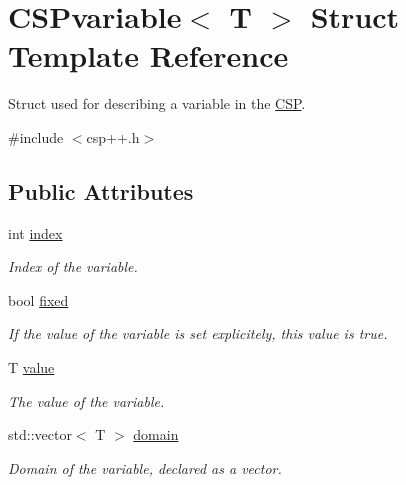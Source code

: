 \hypertarget{structCSPvariable}{
\section{CSPvariable$<$ T $>$ Struct Template Reference}
\label{structCSPvariable}
}


Struct used for describing a variable in the \hyperlink{classCSP}{CSP}.  




{\ttfamily \#include $<$csp++.h$>$}

\subsection*{Public Attributes}
\begin{DoxyCompactItemize}
\item 
\hypertarget{structCSPvariable_a1fb7622b0576133aa9a2445da22fddac}{
int \hyperlink{structCSPvariable_a1fb7622b0576133aa9a2445da22fddac}{index}}
\label{structCSPvariable_a1fb7622b0576133aa9a2445da22fddac}

\begin{DoxyCompactList}\small\item\em Index of the variable. \item\end{DoxyCompactList}\item 
\hypertarget{structCSPvariable_a8e7a1cbd9af27e295508794f871dc599}{
bool \hyperlink{structCSPvariable_a8e7a1cbd9af27e295508794f871dc599}{fixed}}
\label{structCSPvariable_a8e7a1cbd9af27e295508794f871dc599}

\begin{DoxyCompactList}\small\item\em If the value of the variable is set explicitely, this value is true. \item\end{DoxyCompactList}\item 
\hypertarget{structCSPvariable_acc2ff31b449351f04b1c3a2a096e584c}{
T \hyperlink{structCSPvariable_acc2ff31b449351f04b1c3a2a096e584c}{value}}
\label{structCSPvariable_acc2ff31b449351f04b1c3a2a096e584c}

\begin{DoxyCompactList}\small\item\em The value of the variable. \item\end{DoxyCompactList}\item 
\hypertarget{structCSPvariable_a66cf86ebf0fbbf8e571d7b585c9528a2}{
std::vector$<$ T $>$ \hyperlink{structCSPvariable_a66cf86ebf0fbbf8e571d7b585c9528a2}{domain}}
\label{structCSPvariable_a66cf86ebf0fbbf8e571d7b585c9528a2}

\begin{DoxyCompactList}\small\item\em Domain of the variable, declared as a vector. \item\end{DoxyCompactList}\end{DoxyCompactItemize}


